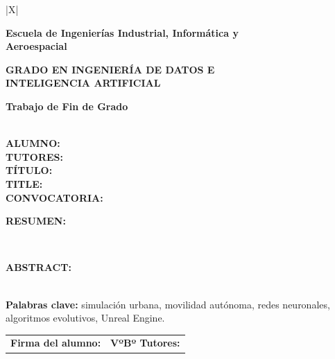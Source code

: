 \noindent
\begin{tabularx}{\textwidth}{|X|}
\hline
\begin{center}
  \vspace{0.25cm}
  {\bfseries\fontsize{16}{19}\selectfont \universidad\par}
  \vspace{0.15cm}
  {\bfseries\fontsize{15}{18}\selectfont Escuela de Ingenierías Industrial, Informática y\\Aeroespacial\par}
  \vspace{0.45cm}
  {\bfseries\fontsize{14}{16}\selectfont GRADO EN INGENIERÍA DE DATOS E\\INTELIGENCIA ARTIFICIAL\par}
  \vspace{0.08cm}
  {\bfseries\fontsize{14}{16}\selectfont Trabajo de Fin de Grado\par}
  \vspace{0.25cm}
\end{center}
\\
\hline
\textbf{ALUMNO:} \autor\\
\hline
\textbf{TUTORES:} \tutores\\
\hline
\textbf{TÍTULO:} \tituloTFG\\
\hline
\textbf{TITLE:} \tituloTFGEng\\
\hline
\textbf{CONVOCATORIA:} \convocatoria\\
\hline
\begin{minipage}[t][4.25cm][t]{\dimexpr\linewidth-2\tabcolsep\relax}
\textbf{RESUMEN:}\\[0.06cm]
\resumenFicha%
\end{minipage}\\
\hline
\begin{minipage}[t][4.25cm][t]{\dimexpr\linewidth-2\tabcolsep\relax}
\textbf{ABSTRACT:}\\[0.06cm]
\abstractFicha%
\end{minipage}\\
\hline
\textbf{Palabras clave:} simulación urbana, movilidad autónoma, redes neuronales, algoritmos evolutivos, Unreal Engine.\\
\hline
\begin{tabular}{p{}|p{}}
\textbf{Firma del alumno:} & \textbf{VºBº Tutores:}\\[1.35cm]
\end{tabular}\\
\hline
\end{tabularx}

